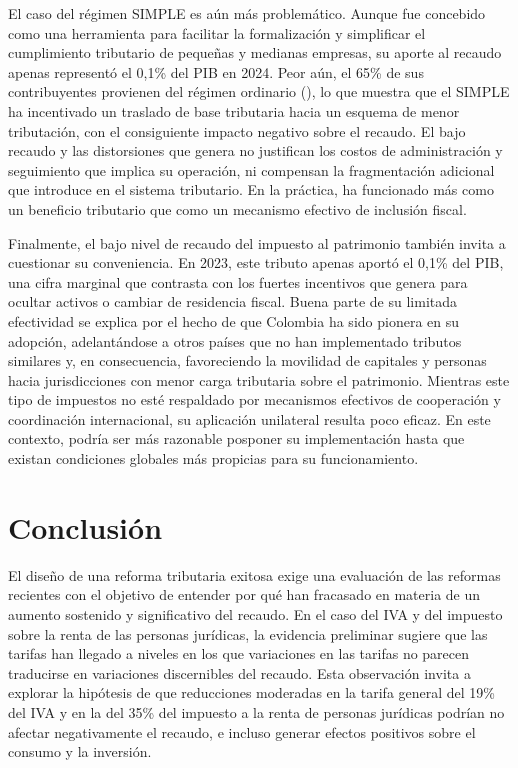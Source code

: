 El caso del régimen SIMPLE es aún más problemático. Aunque fue concebido como una herramienta para facilitar la formalización y simplificar el cumplimiento tributario de pequeñas y medianas empresas, su aporte al recaudo apenas representó el 0,1\% del PIB en 2024. Peor aún, el 65\% de sus contribuyentes provienen del régimen ordinario (\cite{Congreso2024LeyFinanciamiento}), lo que muestra que el SIMPLE ha incentivado un traslado de base tributaria hacia un esquema de menor tributación, con el consiguiente impacto negativo sobre el recaudo. El bajo recaudo y las distorsiones que genera no justifican los costos de administración y seguimiento que implica su operación, ni compensan la fragmentación adicional que introduce en el sistema tributario. En la práctica, ha funcionado más como un beneficio tributario que como un mecanismo efectivo de inclusión fiscal.

Finalmente, el bajo nivel de recaudo del impuesto al patrimonio también invita a cuestionar su conveniencia. En 2023, este tributo apenas aportó el 0,1\% del PIB, una cifra marginal que contrasta con los fuertes incentivos que genera para ocultar activos o cambiar de residencia fiscal. Buena parte de su limitada efectividad se explica por el hecho de que Colombia ha sido pionera en su adopción, adelantándose a otros países que no han implementado tributos similares y, en consecuencia, favoreciendo la movilidad de capitales y personas hacia jurisdicciones con menor carga tributaria sobre el patrimonio. Mientras este tipo de impuestos no esté respaldado por mecanismos efectivos de cooperación y coordinación internacional, su aplicación unilateral resulta poco eficaz. En este contexto, podría ser más razonable posponer su implementación hasta que existan condiciones globales más propicias para su funcionamiento.

\section{Conclusión}

El diseño de una reforma tributaria exitosa exige una evaluación de las reformas recientes con el objetivo de entender por qué han fracasado en materia de un aumento sostenido y significativo del recaudo.  En el caso del IVA y del impuesto sobre la renta de las personas jurídicas, la evidencia preliminar sugiere que las tarifas han llegado a niveles en los que variaciones en las tarifas no parecen traducirse en variaciones discernibles del recaudo. Esta observación invita a explorar la hipótesis de que reducciones moderadas en la tarifa general del 19\% del IVA y en la del 35\% del impuesto a la renta de personas jurídicas podrían no afectar negativamente el recaudo, e incluso generar efectos positivos sobre el consumo y la inversión.


